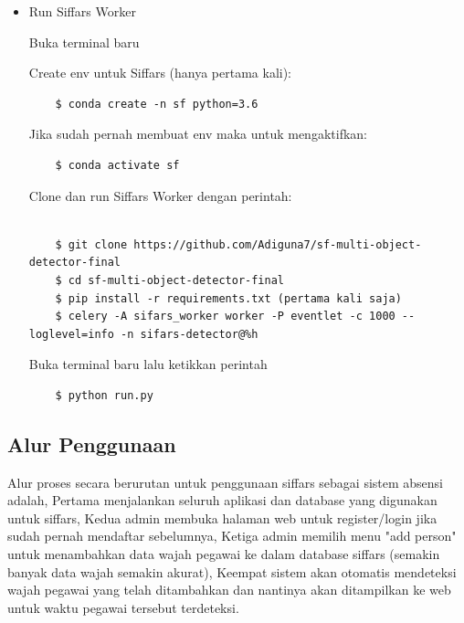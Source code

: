 \begin{itemize}
  \item Run Siffars Worker
  
  Buka terminal baru 
  
  Create env untuk Siffars (hanya pertama kali):
  \begin{lstlisting}
    $ conda create -n sf python=3.6
  \end{lstlisting}
  Jika sudah pernah membuat env maka untuk mengaktifkan:
  \begin{lstlisting}
    $ conda activate sf
  \end{lstlisting}
  Clone dan run Siffars Worker dengan perintah:
  \begin{lstlisting}

    $ git clone https://github.com/Adiguna7/sf-multi-object-detector-final
    $ cd sf-multi-object-detector-final
    $ pip install -r requirements.txt (pertama kali saja)
    $ celery -A sifars_worker worker -P eventlet -c 1000 --loglevel=info -n sifars-detector@%h
  \end{lstlisting}

  Buka terminal baru lalu ketikkan perintah

  \begin{lstlisting}
    $ python run.py
  \end{lstlisting}

\end{itemize}

\subsection{Alur Penggunaan}
Alur proses secara berurutan untuk penggunaan siffars sebagai sistem absensi adalah, Pertama menjalankan seluruh
aplikasi dan database yang digunakan untuk siffars, Kedua admin membuka halaman web untuk register/login jika sudah
pernah mendaftar sebelumnya, Ketiga admin memilih menu "add person" untuk menambahkan data wajah pegawai ke dalam database siffars
(semakin banyak data wajah semakin akurat), Keempat sistem akan otomatis mendeteksi wajah pegawai yang telah ditambahkan
dan nantinya akan ditampilkan ke web untuk waktu pegawai tersebut terdeteksi.

